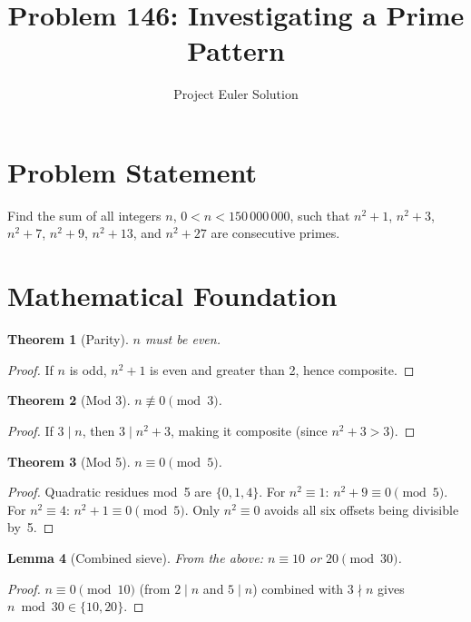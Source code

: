 \documentclass[12pt]{article}
\title{Problem 146: Investigating a Prime Pattern}
\author{Project Euler Solution}
\date{}
\newtheorem{theorem}{Theorem}
\newtheorem{lemma}[theorem]{Lemma}
\begin{document}
\maketitle

\section{Problem Statement}
Find the sum of all integers $n$, $0 < n < 150\,000\,000$, such that $n^2+1$, $n^2+3$, $n^2+7$, $n^2+9$, $n^2+13$, and $n^2+27$ are consecutive primes.

\section{Mathematical Foundation}

\begin{theorem}[Parity]
$n$ must be even.
\end{theorem}

\begin{proof}
If $n$ is odd, $n^2+1$ is even and greater than 2, hence composite.
\end{proof}

\begin{theorem}[Mod 3]
$n \not\equiv 0 \pmod{3}$.
\end{theorem}

\begin{proof}
If $3 \mid n$, then $3 \mid n^2+3$, making it composite (since $n^2+3 > 3$).
\end{proof}

\begin{theorem}[Mod 5]
$n \equiv 0 \pmod{5}$.
\end{theorem}

\begin{proof}
Quadratic residues mod~5 are $\{0,1,4\}$. For $n^2 \equiv 1$: $n^2+9 \equiv 0 \pmod{5}$. For $n^2 \equiv 4$: $n^2+1 \equiv 0 \pmod{5}$. Only $n^2 \equiv 0$ avoids all six offsets being divisible by~5.
\end{proof}

\begin{lemma}[Combined sieve]
From the above: $n \equiv 10$ or $20 \pmod{30}$.
\end{lemma}

\begin{proof}
$n \equiv 0 \pmod{10}$ (from $2 \mid n$ and $5 \mid n$) combined with $3 \nmid n$ gives $n \bmod 30 \in \{10, 20\}$.
\end{proof}
\end{document}
